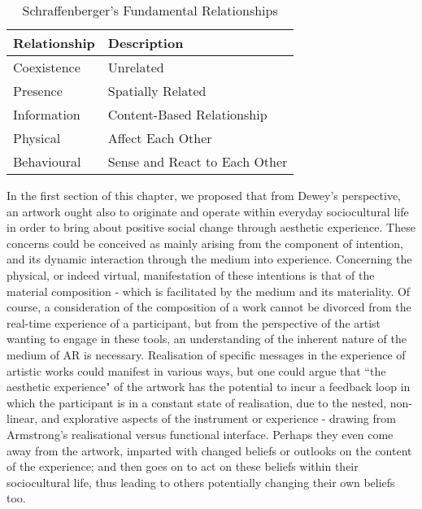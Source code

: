\begin{table}
    \centering
    \begin{tabular}{ l l }
        \toprule
        Relationship        & Description                       \\
        \midrule
        Coexistence         & Unrelated                         \\
        Presence            & Spatially Related                 \\
        Information         & Content-Based Relationship        \\
        Physical            & Affect Each Other                 \\
        Behavioural         & Sense and React to Each Other     \\
        \bottomrule
    \end{tabular}
    \caption{Schraffenberger's Fundamental Relationships}\label{table:schraffenbergertaxonomy2}
\end{table}
In the first section of this chapter, we proposed that from Dewey's perspective, an artwork ought also to originate and operate within everyday sociocultural life in order to bring about positive social change through aesthetic experience. These concerns could be conceived as mainly arising from the component of intention, and its dynamic interaction through the medium into experience. Concerning the physical, or indeed virtual, manifestation of these intentions is that of the material composition - which is facilitated by the medium and its materiality. Of course, a consideration of the composition of a work cannot be divorced from the real-time experience of a participant, but from the perspective of the artist wanting to engage in these tools, an understanding of the inherent nature of the medium of AR is necessary.  Realisation of specific messages in the experience of artistic works could manifest in various ways, but one could argue that ``the aesthetic experience" of the artwork has the potential to incur a feedback loop in which the participant is in a constant state of realisation, due to the nested, non-linear, and explorative aspects of the instrument or experience - drawing from Armstrong's realisational versus functional interface. Perhaps they even come away from the artwork, imparted with changed beliefs or outlooks on the content of the experience; and then goes on to act on these beliefs within their sociocultural life, thus leading to others potentially changing their own beliefs too.

